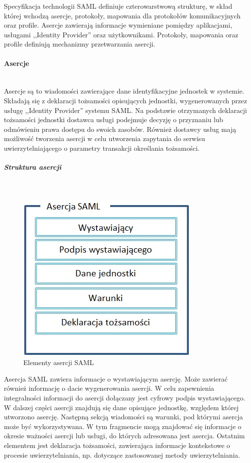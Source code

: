 		Specyfikacja technologii SAML definiuje czterowarstwową strukturę, w skład której wchodzą asercje, protokoły, mapowania dla protokołów komunikacyjnych oraz profile. 
		Asercje zawierają informacje wymieniane pomiędzy aplikacjami, usługami ,,Identity Provider'' oraz użytkownikami. Protokoły, mapowania oraz profile definiują mechanizmy przetwarzania asercji.

		\paragraph{Asercje}\mbox{}\\
					
			Asercje są to wiadomości zawierające dane identyfikacyjne jednostek w systemie. Składają się z deklaracji tożsamości opisujących jednostki, wygenerowanych przez usługę ,,Identity Provider'' systemu SAML. Na podstawie otrzymanych deklaracji tożsamości jednostki dostawca usługi podejmuje decyzję o przyznaniu lub odmówieniu prawa dostępu do swoich zasobów. Również dostawcy usług mają możliwość tworzenia asercji w celu utworzenia zapytania do serwisu uwierzytelniającego o parametry transakcji określania tożsamości. 

			\subparagraph{Struktura asercji}\mbox{}\\
			
				\begin{figure}[h]
				\centering
					\includegraphics{img/samlAssertion.jpg}
				\caption{Elementy asercji SAML}
				\label{Elementy asercji SAML}
				\end{figure}

				Asercja SAML zawiera informacje o wystawiającym asercję. Może zawierać również informację o dacie wygenerowania asercji. W celu zapewnienia integralności informacji do asercji dołączany jest cyfrowy podpis wystawiającego. W dalszej części asercji znajdują się dane opisujące jednostkę, względem której utworzono asercję. Następną sekcją wiadomości są warunki, pod którymi asercja może być wykorzystywana. W tym fragmencie mogą znajdować się informacje o okresie ważności asercji lub usługi, do których adresowana jest asercja. Ostatnim elementem jest deklaracja tożsamości, zawierająca informacje kontekstowe o procesie uwierzytelniania, np. dotyczące zastosowanej metody uwierzytelniania.

